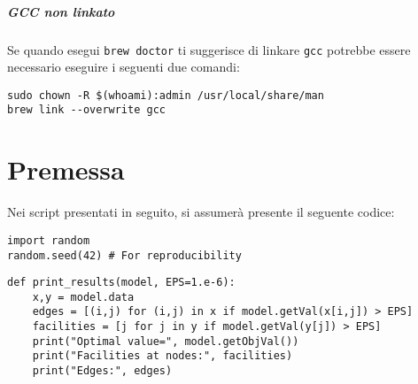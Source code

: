 \documentclass[\main/main.tex]{subfiles}
\begin{document}
\paragraph*{GCC non linkato}
Se quando esegui \texttt{brew doctor} ti suggerisce di linkare \texttt{gcc} potrebbe essere necessario eseguire i seguenti due comandi:

\begin{verbatim}
sudo chown -R $(whoami):admin /usr/local/share/man
brew link --overwrite gcc
\end{verbatim}

\chapter{Premessa}
Nei script presentati in seguito, si assumerà presente il seguente codice:

\begin{verbatim}
import random
random.seed(42) # For reproducibility
\end{verbatim}

\begin{verbatim}
def print_results(model, EPS=1.e-6):
    x,y = model.data
    edges = [(i,j) for (i,j) in x if model.getVal(x[i,j]) > EPS]
    facilities = [j for j in y if model.getVal(y[j]) > EPS]
    print("Optimal value=", model.getObjVal())
    print("Facilities at nodes:", facilities)
    print("Edges:", edges)
\end{verbatim}
\end{document}
